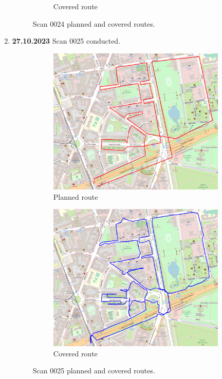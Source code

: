 \documentclass[a4paper,12pt]{article}
\begin{document}
\begin{enumerate}
\begin{figure}[H]
\begin{subfigure}{.80\textwidth}
			\caption{Covered route}
			\label{fig:b24}
		\end{subfigure}
		\caption{Scan 0024 planned and covered routes.}
		\label{fig:fig24}
	\end{figure}
	\item \textbf{27.10.2023} Scan 0025 conducted.
	\begin{figure}[H]
		\centering
		\begin{subfigure}{.84\textwidth}
			\centering
			\includegraphics[width=1\linewidth]{route_p25}
			\caption{Planned route}
			\label{fig:a25}
		\end{subfigure}%
		\linebreak
		\begin{subfigure}{.84\textwidth}
			\centering
			\includegraphics[width=1\linewidth]{route_c25}
			\caption{Covered route}
			\label{fig:b25}
		\end{subfigure}
		\caption{Scan 0025 planned and covered routes.}
		\label{fig:fig25}
	\end{figure}
\end{enumerate}
\end{document}
